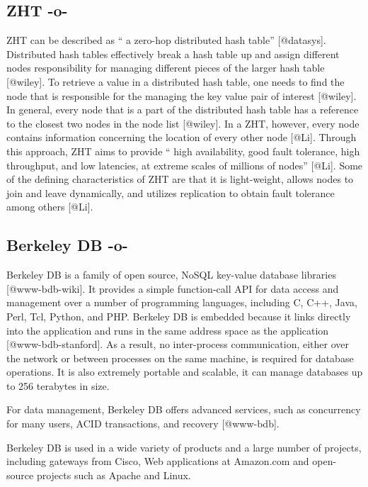 \subsection{ZHT -o-}

ZHT can be described as `` a zero-hop distributed hash
table'' [@datasys]. Distributed hash tables effectively break a
hash table up and assign different nodes responsibility for managing
different pieces of the larger hash table [@wiley]. To retrieve a
value in a distributed hash table, one needs to find the node that is
responsible for the managing the key value pair of
interest [@wiley]. In general, every node that is a part of the
distributed hash table has a reference to the closest two nodes in the
node list [@wiley]. In a ZHT, however, every node contains
information concerning the location of every other
node [@Li]. Through this approach, ZHT aims to provide `` high
availability, good fault tolerance, high throughput, and low
latencies, at extreme scales of millions of nodes'' [@Li].  Some
of the defining characteristics of ZHT are that it is light-weight,
allows nodes to join and leave dynamically, and utilizes replication
to obtain fault tolerance among others [@Li].


     
\subsection{Berkeley DB -o-}

Berkeley DB is a family of open source, NoSQL key-value database
libraries [@www-bdb-wiki]. It provides a simple function-call API
for data access and management over a number of programming languages,
including C, C++, Java, Perl, Tcl, Python, and PHP. Berkeley DB is
embedded because it links directly into the application and runs in
the same address space as the application [@www-bdb-stanford]. As
a result, no inter-process communication, either over the network or
between processes on the same machine, is required for database
operations. It is also extremely portable and scalable, it can manage
databases up to 256 terabytes in size.
     
For data management, Berkeley DB offers advanced services, such as
concurrency for many users, ACID transactions, and
recovery [@www-bdb].
     
Berkeley DB is used in a wide variety of products and a large number
of projects, including gateways from Cisco, Web applications at
Amazon.com and open-source projects such as Apache and Linux.



